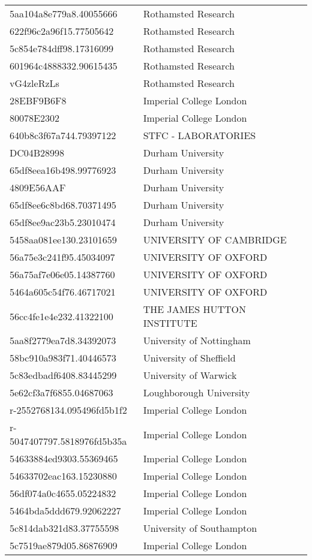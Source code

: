 \begin{tabular}{ll}
5aa104a8e779a8.40055666 & Rothamsted Research \\
622f96c2a96f15.77505642 & Rothamsted Research \\
5c854e784dff98.17316099 & Rothamsted Research \\
601964c4888332.90615435 & Rothamsted Research \\
vG4zleRzLs & Rothamsted Research \\
28EBF9B6F8 & Imperial College London \\
80078E2302 & Imperial College London \\
640b8c3f67a744.79397122 & STFC - LABORATORIES \\
DC04B28998 & Durham University \\
65df8eea16b498.99776923 & Durham University \\
4809E56AAF & Durham University \\
65df8ee6c8bd68.70371495 & Durham University \\
65df8ee9ac23b5.23010474 & Durham University \\
5458aa081ee130.23101659 & UNIVERSITY OF CAMBRIDGE \\
56a75e3c241f95.45034097 & UNIVERSITY OF OXFORD \\
56a75af7e06e05.14387760 & UNIVERSITY OF OXFORD \\
5464a605c54f76.46717021 & UNIVERSITY OF OXFORD \\
56cc4fe1e4e232.41322100 & THE JAMES HUTTON INSTITUTE \\
5aa8f2779ea7d8.34392073 & University of Nottingham \\
58bc910a983f71.40446573 & University of Sheffield \\
5c83edbadf6408.83445299 & University of Warwick \\
5e62cf3a7f6855.04687063 & Loughborough University \\
r-2552768134.095496fd5b1f2 & Imperial College London \\
r-5047407797.5818976fd5b35a & Imperial College London \\
54633884ed9303.55369465 & Imperial College London \\
54633702eac163.15230880 & Imperial College London \\
56df074a0c4655.05224832 & Imperial College London \\
5464bda5ddd679.92062227 & Imperial College London \\
5c814dab321d83.37755598 & University of Southampton \\
5c7519ae879d05.86876909 & Imperial College London \\

\end{tabular}
